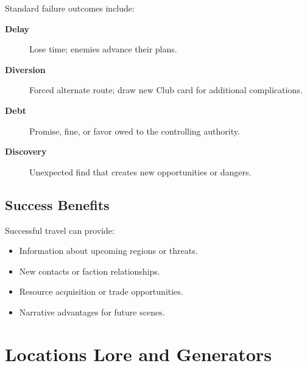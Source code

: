 Standard failure outcomes include:
\begin{description}
\item[\textbf{Delay}] Lose time; enemies advance their plans.
\item[\textbf{Diversion}] Forced alternate route; draw new Club card for additional complications.
\item[\textbf{Debt}] Promise, fine, or favor owed to the controlling authority.
\item[\textbf{Discovery}] Unexpected find that creates new opportunities or dangers.
\end{description}

\subsection{Success Benefits}
\label{subsec:success-benefits}

Successful travel can provide:
\begin{itemize}
\item Information about upcoming regions or threats.
\item New contacts or faction relationships.
\item Resource acquisition or trade opportunities.
\item Narrative advantages for future scenes.
\end{itemize}

\clearpage
\section{Locations Lore and Generators}


\clearpage

\clearpage

\clearpage

\clearpage

\clearpage

\clearpage

\clearpage

\clearpage

\clearpage

\clearpage

\clearpage

\clearpage

\clearpage

\clearpage

\clearpage

\clearpage

\clearpage

\clearpage

\clearpage

\clearpage

\clearpage

\clearpage
